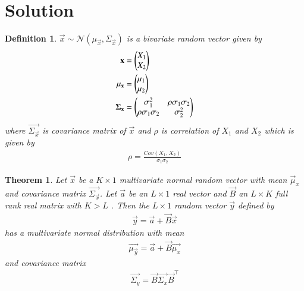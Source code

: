 \documentclass[journal,12pt,twocolumn]{IEEEtran}
\newtheorem{theorem}{Theorem}[section]
\newtheorem{definition}{Definition}[section]
\begin{document}
\section*{Solution}
\begin{definition}
    $\vec{x}\sim\mathcal{N}(\mu_{\vec{x}},\Sigma_{\vec{x}})$ is a bivariate random vector given by
    \begin{align}
        \mathbf{x}&=\begin{pmatrix}X_1\\
                       X_2\end{pmatrix}\\
        \mathbf{\mu_{\mathbf{x}}}&=\begin{pmatrix}\mu_1\\
                                    \mu_2\end{pmatrix}\\
        \mathbf{\Sigma_{\mathbf{x}}}&=\begin{pmatrix}\sigma_1^2&\rho\sigma_1\sigma_2\\
                                        \rho\sigma_1\sigma_2&\sigma_2^2\end{pmatrix}
    \end{align}
    where $\vec{\Sigma_{\vec{x}}}$ is covariance matrix of $\vec{x}$ and $\rho$ is correlation of $X_1$ and $X_2$ which is given by
    \begin{align}
        \rho=\frac{Cov(X_1,X_2)}{\sigma_1\sigma_2}
    \end{align}
\end{definition}
\begin{theorem}
     Let $\vec{x}$ be a $K\times1$ multivariate normal random vector with mean $\vec{\mu}_x$ and covariance matrix $\vec{\Sigma_{\vec{x}}}$. Let $\vec{a}$ be an $L\times1$ real vector and $\vec{B}$ an $L\times K$ full rank real matrix with $K>L$ . Then the $L\times1$ random vector $\vec{y}$ defined by
     \begin{align}
         \vec{y}=\vec{a}+\vec{B}\vec{x}
     \end{align}
     has a multivariate normal distribution with mean
     \begin{align}
         \vec{\mu_\vec{y}}=\vec{a}+\vec{B}\vec{\mu_x}
     \end{align}
     and covariance matrix
     \begin{align}
         \vec{\Sigma_y}=\vec{B}\vec{\Sigma_x}\vec{B}^{\top}
     \end{align}
\end{theorem}
\end{document}
